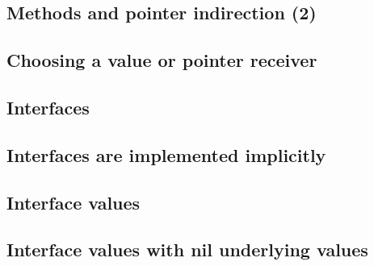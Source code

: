 \subsection{Methods and pointer indirection (2)}




\subsection{Choosing a value or pointer receiver}




\subsection{Interfaces}




\subsection{Interfaces are implemented implicitly}




\subsection{Interface values}




\subsection{Interface values with nil underlying values}




